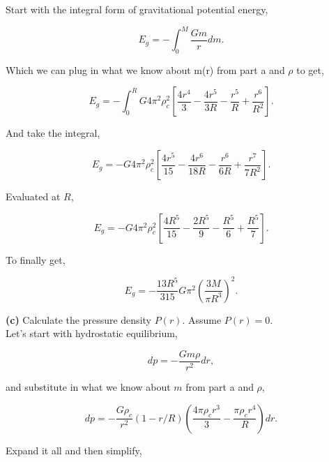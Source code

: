 \documentclass[12pt]{article}
\begin{document}
\noindent Start with the integral form of gravitational potential energy,

\begin{equation}
E_g = - \int_0^M \frac{Gm}{r}dm.
\end{equation} 

\noindent Which we can plug in what we know about m(r) from part a and $\rho$ to get, 

\begin{equation}
E_g = - \int_0^R G4\pi^2\rho_c^2 \left [ \frac{4r^4}{3} - \frac{4r^5}{3R} - \frac{r^5}{R} + \frac{r^6}{R^2} \right].
\end{equation} 

\noindent And take the integral,

\begin{equation}
E_g = -  G4\pi^2\rho_c^2 \left [ \frac{4r^5}{15} - \frac{4r^6}{18R} - \frac{r^6}{6R} + \frac{r^7}{7R^2} \right].
\end{equation} 

\noindent Evaluated at $R$,

\begin{equation}
E_g = -  G4\pi^2\rho_c^2 \left [ \frac{4R^5}{15} - \frac{2R^5}{9} - \frac{R^5}{6} + \frac{R^5}{7} \right].
\end{equation} 

\noindent To finally get,

\begin{equation}
E_g = - \frac{13R^5}{315}G\pi^2 \left ( \frac{3M}{\pi R^3} \right)^2.
\end{equation} 


\noindent \textbf{(c)} Calculate the pressure density $P\left ( r \right)$. Assume  $P\left ( r \right) = 0$. \\

\noindent Let's start with hydrostatic equilibrium,

\begin{equation}
dp = -\frac{Gm\rho}{r^2} dr,
\end{equation}

\noindent and substitute in what we know about $m$ from part a and $\rho$,

\begin{equation}
dp = -\frac{G\rho_c}{r^2} \left(1 - r/R \right)\left( \frac{4\pi\rho_cr^3}{3} - \frac{\pi\rho_cr^4}{R} \right) dr.
\end{equation}

\noindent Expand it all and then simplify, 
\end{document}
